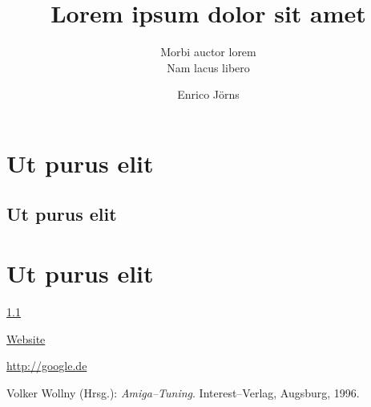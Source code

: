 \documentclass[a4paper,extramargin,violet,hyperrefdark]{tubsartcl}
\title{Lorem ipsum dolor sit amet}
\subtitle{Morbi auctor lorem\vphantom{g}\\ %
Nam lacus libero}
\author{Enrico Jörns}
\begin{document}
\tableofcontents

\section{Ut purus elit}
\subsection{Ut purus elit}\label{asdf}
\section{Ut purus elit}
\lipsum[1]

\Large

\ref{asdf}

\href{bla}{Website}

\url{http://google.de}

\cite{atuning}


\begin{thebibliography}{sotief}
  Volker Wollny (Hrsg.): {\it Amiga--Tuning}.
                   Interest--Verlag, Augsburg, 1996.
\end{thebibliography}
\end{document}
